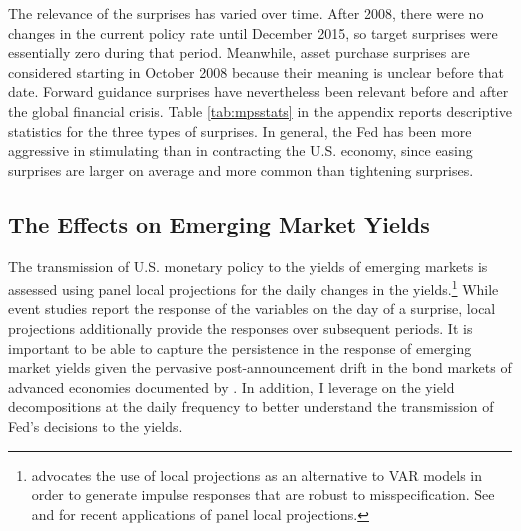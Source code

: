 {%
The relevance of the surprises has varied over time.
After 2008, there were no changes in the current policy rate until %
December 2015, so target surprises were essentially zero during that period.
Meanwhile, asset purchase surprises are considered starting in October 2008 because their meaning is unclear before that date.
Forward guidance surprises have nevertheless been relevant before and after the global financial crisis. %
Table \ref{tab:mpsstats} in the appendix reports descriptive statistics for the three types of surprises. %
In general, the Fed has been more aggressive in stimulating than in contracting the U.S. economy, since easing surprises are larger on average and more common than tightening surprises.


\subsection{The Effects on Emerging Market Yields} \label{sec:LPs} %
\iftoggle{toclinks}{\gototoc}{} %

The transmission of U.S. monetary policy to the yields of emerging markets is assessed using panel local projections for the daily changes in the 
yields.\footnote{ \cite{Jorda:2005} advocates the use of local projections as an alternative to VAR models in order to generate impulse responses that are robust to misspecification. See \cite{HofmannShimShin:2019} and \cite{ACDM:2019} for recent applications of panel local projections.}
While event studies report the response of the variables on the day of a surprise,
local projections %
additionally provide the responses over subsequent periods.
It is important to be able to capture the persistence in the response of emerging market yields given the pervasive post-announcement drift in the bond markets 
of advanced economies documented by \cite{BrooksKatzLustig:2019}.
In addition, I leverage on the yield decompositions at the daily frequency to better understand the transmission of Fed's decisions to the yields. %

}
